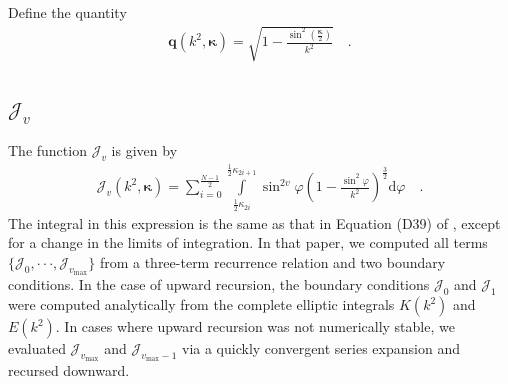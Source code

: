 \documentclass[modern]{aastex62}
\newcommand{\kap}{\boldsymbol{\kappa}}
\newcommand{\vmax}{{v_\mathrm{max}}}
\begin{document}
Define the quantity
%
\begin{align}
    \label{eq:q}
    \mathbf{q}(k^2, \kap) = \sqrt{1 - \frac{\sin^2\left(\frac{\kap}{2}\right)}{k^2}}
    \quad.
\end{align}

\subsection{$\mathcal{J}_v$}
%
The function $\mathcal{J}_v$ is given by
%
\begin{align}
    \label{eq:J}
    \mathcal{J}_v(k^2, \kap) =
    \sum_{i = 0}^{\frac{N - 1}{2}}
    \int\limits_{\frac{1}{2}\kappa_{2i}}^{\frac{1}{2}\kappa_{2i+1}}
    \sin^{2v}\varphi
    \left(1 - \frac{\sin^2\varphi}{k^2}\right)^\frac{3}{2}
    \mathrm{d}\varphi
    \quad.
\end{align}
%
The integral in this expression is the same as that in Equation (D39)
of \citet{Luger2019}, except for a change in the limits of integration.
In that paper, we computed all terms
$\{ \mathcal{J}_0, {\cdot\cdot\cdot}, \mathcal{J}_\vmax \}$ from a three-term
recurrence relation and two boundary conditions. In the case of upward
recursion, the boundary conditions $\mathcal{J}_0$ and $\mathcal{J}_1$ were
computed analytically from the complete elliptic integrals $K(k^2)$
and $E(k^2)$. In cases where upward recursion was not numerically stable, we
evaluated $\mathcal{J}_\vmax$ and $\mathcal{J}_{\vmax-1}$
via a quickly convergent series expansion and recursed downward.
\end{document}
